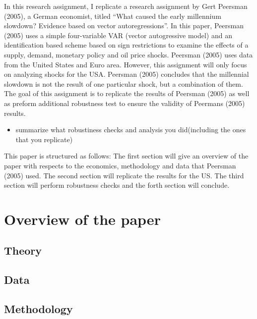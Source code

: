 \documentclass[11pt,preprint, authoryear]{elsarticle}
\numberwithin{equation}{section}
\numberwithin{figure}{section}
\numberwithin{table}{section}
\def\tightlist{} %
\begin{document}
In this research assignment, I replicate a research assignment by Gert
Peersman (2005), a German economist, titled ``What caused the early
millennium slowdown? Evidence based on vector autoregressions''. In this
paper, Peersman (2005) uses a simple four-variable VAR (vector
autogressive model) and an identification based scheme based on sign
restrictions to examine the effects of a supply, demand, monetary policy
and oil price shocks. Peersman (2005) uses data from the United States
and Euro area. However, this assignment will only focus on analyzing
shocks for the USA. Peersman (2005) concludes that the millennial
slowdown is not the result of one particular shock, but a combination of
them. The goal of this assignment is to replicate the results of
Peersman (2005) as well as preform additional robustness test to ensure
the validity of Peermans (2005) results.

\begin{itemize}
\tightlist
\item
  summarize what robustiness checks and analysis you did(including the
  ones that you replicate)
\end{itemize}

This paper is structured as follows: The first section will give an
overview of the paper with respects to the economics, methodology and
data that Peersman (2005) used. The second section will replicate the
results for the US. The third section will perform robustness checks and
the forth section will conclude.

\hypertarget{overview-of-the-paper}{%
\section{Overview of the paper}\label{overview-of-the-paper}}

\hypertarget{theory}{%
\subsection{Theory}\label{theory}}

\hypertarget{data}{%
\subsection{Data}\label{data}}

\hypertarget{methodology}{%
\subsection{Methodology}\label{methodology}}
\end{document}
